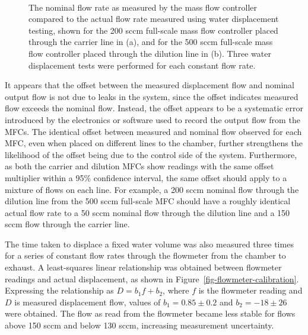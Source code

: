 \documentclass[
  a4paper,
]{scrbook}
\begin{document}
\begin{figure}
\begin{minipage}[t]{0.45\linewidth}
{{}

}

\end{minipage}%
%
\begin{minipage}[t]{0.01\linewidth}

{\centering 

~

}

\end{minipage}%

\caption[Calibration curves showing the nominal flow rate as measured by
the mass flow controller compared to the actual flow rate measured using
water displacement testing.]{\label{fig-MFC-calibration-curves}The
nominal flow rate as measured by the mass flow controller compared to
the actual flow rate measured using water displacement testing, shown
for the 200 sccm full-scale mass flow controller placed through the
carrier line in (a), and for the 500 sccm full-scale mass flow
controller placed through the dilution line in (b). Three water
displacement tests were performed for each constant flow rate.}

\end{figure}

It appears that the offset between the measured displacement flow and
nominal output flow is not due to leaks in the system, since the offset
indicates measured flow exceeds the nominal flow. Instead, the offset
appears to be a systematic error introduced by the electronics or
software used to record the output flow from the MFCs. The identical
offset between measured and nominal flow observed for each MFC, even
when placed on different lines to the chamber, further strengthens the
likelihood of the offset being due to the control side of the system.
Furthermore, as both the carrier and dilution MFCs show readings with
the same offset multiplier within a 95\% confidence interval, the same
offset should apply to a mixture of flows on each line. For example, a
200 sccm nominal flow through the dilution line from the 500 sccm
full-scale MFC should have a roughly identical actual flow rate to a 50
sccm nominal flow through the dilution line and a 150 sccm flow through
the carrier line.

The time taken to displace a fixed water volume was also measured three
times for a series of constant flow rates through the flowmeter from the
chamber to exhaust. A least-squares linear relationship was obtained
between flowmeter readings and actual displacement, as shown in
Figure~\ref{fig-flowmeter-calibration}. Expressing the relationship as
\(D = b_1f + b_2\), where \(f\) is the flowmeter reading and \(D\) is
measured displacement flow, values of \(b_1 = 0.85 \pm 0.2\) and
\(b_2 = -18 \pm 26\) were obtained. The flow as read from the flowmeter
became less stable for flows above 150 sccm and below 130 sccm,
increasing measurement uncertainty.
\end{document}
